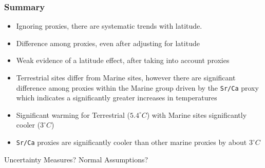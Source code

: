 \documentclass[]{beamer}
\begin{document}
\begin{frame}
  \frametitle{Summary}
  \begin{itemize}
   \item Ignoring proxies, there are systematic trends with
     latitude. \pause
  \item Difference among proxies, even after adjusting for latitude \pause
\item Weak evidence of a latitude effect, after taking into account proxies
\pause
 \item  Terrestrial sites differ from Marine sites, however there are significant difference among
      proxies within the Marine group  driven by the {\tt Sr/Ca} proxy which
      indicates a significantly greater increases in temperatures 
\pause
   \item Significant warming for Terrestrial ($5.4 ^\circ C$) with
     Marine  sites   significantly  cooler ($3^ \circ  C$)\pause 
   \item {\tt Sr/Ca} proxies are significantly cooler than other
     marine proxies by about $3^\circ C$ \pause
  \end{itemize}

Uncertainty Measures?  \pause  Normal Assumptions? 
\end{frame}
\end{document}
